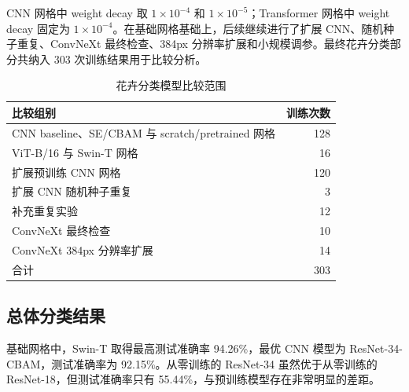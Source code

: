 \documentclass[UTF8,a4paper,11pt]{ctexart}
\begin{document}
CNN 网格中 weight decay 取 \(1\times10^{-4}\) 和 \(1\times10^{-5}\)；Transformer 网格中 weight decay 固定为 \(1\times10^{-4}\)。在基础网格基础上，后续继续进行了扩展 CNN、随机种子重复、ConvNeXt 最终检查、384px 分辨率扩展和小规模调参。最终花卉分类部分共纳入 303 次训练结果用于比较分析。

\begin{table}[H]
    \centering
    \caption{花卉分类模型比较范围}
    \small
    \begin{tabular}{lr}
        \toprule
        比较组别 & 训练次数 \\
        \midrule
        CNN baseline、SE/CBAM 与 scratch/pretrained 网格 & 128 \\
        ViT-B/16 与 Swin-T 网格 & 16 \\
        扩展预训练 CNN 网格 & 120 \\
        扩展 CNN 随机种子重复 & 3 \\
        补充重复实验 & 12 \\
        ConvNeXt 最终检查 & 10 \\
        ConvNeXt 384px 分辨率扩展 & 14 \\
        \midrule
        合计 & 303 \\
        \bottomrule
    \end{tabular}
\end{table}

\subsection{总体分类结果}

基础网格中，Swin-T 取得最高测试准确率 94.26\%，最优 CNN 模型为 ResNet-34-CBAM，测试准确率为 92.15\%。从零训练的 ResNet-34 虽然优于从零训练的 ResNet-18，但测试准确率只有 55.44\%，与预训练模型存在非常明显的差距。
\end{document}
